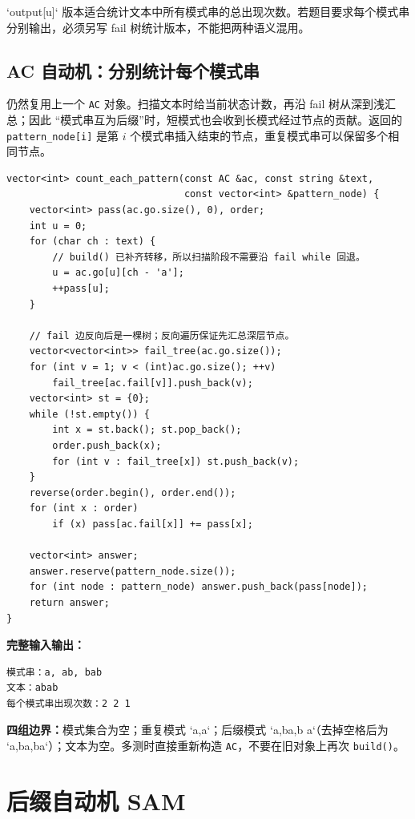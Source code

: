\begin{warnbox}
`output[u]` 版本适合统计文本中所有模式串的总出现次数。若题目要求每个模式串分别输出，必须另写 fail 树统计版本，不能把两种语义混用。
\end{warnbox}

\subsection{AC 自动机：分别统计每个模式串}

仍然复用上一个 \texttt{AC} 对象。扫描文本时给当前状态计数，再沿 fail 树从深到浅汇总；因此
“模式串互为后缀”时，短模式也会收到长模式经过节点的贡献。返回的 \texttt{pattern\_node[i]}
是第 \(i\) 个模式串插入结束的节点，重复模式串可以保留多个相同节点。

\begin{lstlisting}[style=cpp]
vector<int> count_each_pattern(const AC &ac, const string &text,
                               const vector<int> &pattern_node) {
    vector<int> pass(ac.go.size(), 0), order;
    int u = 0;
    for (char ch : text) {
        // build() 已补齐转移，所以扫描阶段不需要沿 fail while 回退。
        u = ac.go[u][ch - 'a'];
        ++pass[u];
    }

    // fail 边反向后是一棵树；反向遍历保证先汇总深层节点。
    vector<vector<int>> fail_tree(ac.go.size());
    for (int v = 1; v < (int)ac.go.size(); ++v)
        fail_tree[ac.fail[v]].push_back(v);
    vector<int> st = {0};
    while (!st.empty()) {
        int x = st.back(); st.pop_back();
        order.push_back(x);
        for (int v : fail_tree[x]) st.push_back(v);
    }
    reverse(order.begin(), order.end());
    for (int x : order)
        if (x) pass[ac.fail[x]] += pass[x];

    vector<int> answer;
    answer.reserve(pattern_node.size());
    for (int node : pattern_node) answer.push_back(pass[node]);
    return answer;
}
\end{lstlisting}

\begin{card}
\textbf{完整输入输出：}
\begin{lstlisting}
模式串：a, ab, bab
文本：abab
每个模式串出现次数：2 2 1
\end{lstlisting}
\textbf{四组边界：}模式集合为空；重复模式 `a,a`；后缀模式 `a,ba,b a`（去掉空格后为
`a,ba,ba`）；文本为空。多测时直接重新构造 \texttt{AC}，不要在旧对象上再次
\texttt{build()}。
\end{card}

\section{后缀自动机 SAM}

